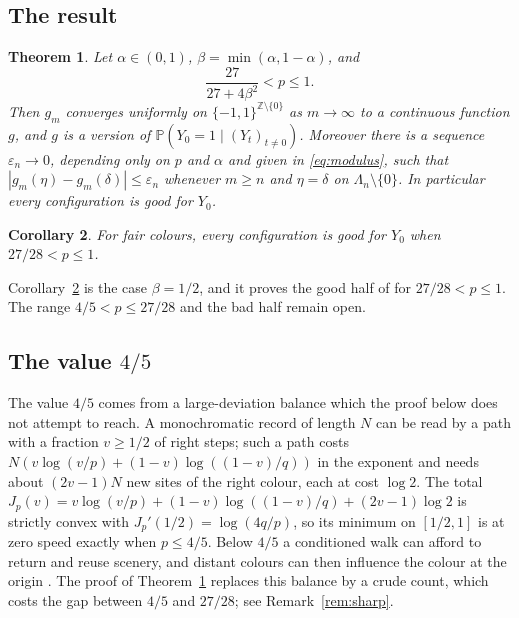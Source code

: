 \documentclass[11pt]{amsart}
\newtheorem{theorem}{Theorem}[section]
\newtheorem{corollary}[theorem]{Corollary}
\theoremstyle{remark}
\newcommand{\Z}{\mathbb{Z}}
\newcommand{\PP}{\mathbb{P}}
\begin{document}
\subsection{The result}

\begin{theorem}\label{thm:main}
Let $\alpha\in(0,1)$, $\beta=\min(\alpha,1-\alpha)$, and
\[
\frac{27}{27+4\beta^2}<p\le1 .
\]
Then $g_m$ converges uniformly on $\{-1,1\}^{\Z\setminus\{0\}}$ as $m\to\infty$ to a continuous function $g$, and $g$
is a version of $\PP(Y_0=1\mid(Y_t)_{t\ne0})$. Moreover there is a sequence $\varepsilon_n\to0$, depending only on
$p$ and $\alpha$ and given in \eqref{eq:modulus}, such that $|g_m(\eta)-g_m(\delta)|\le\varepsilon_n$ whenever $m\ge n$
and $\eta=\delta$ on $\Lambda_n\setminus\{0\}$. In particular every configuration is good for $Y_0$.
\end{theorem}

\begin{corollary}\label{cor:fair}
For fair colours, every configuration is good for $Y_0$ when $27/28<p\le1$.
\end{corollary}

Corollary~\ref{cor:fair} is the case $\beta=1/2$, and it proves the good half of \cite[Conjecture~2.16]{dHS06} for
$27/28<p\le1$. The range $4/5<p\le27/28$ and the bad half remain open.

\subsection{The value \texorpdfstring{$4/5$}{4/5}}
The value $4/5$ comes from a large-deviation balance which the proof below does not attempt to reach. A monochromatic
record of length $N$ can be read by a path with a fraction $v\ge1/2$ of right steps; such a path costs
$N(v\log(v/p)+(1-v)\log((1-v)/q))$ in the exponent and needs about $(2v-1)N$ new sites of the right colour, each at
cost $\log2$. The total $J_p(v)=v\log(v/p)+(1-v)\log((1-v)/q)+(2v-1)\log2$ is strictly convex with
$J_p'(1/2)=\log(4q/p)$, so its minimum on $[1/2,1]$ is at zero speed exactly when $p\le4/5$. Below $4/5$ a conditioned
walk can afford to return and reuse scenery, and distant colours can then influence the colour at the origin
\cite[Section~1.3]{BdHS11}. The proof of Theorem~\ref{thm:main} replaces this balance by a crude count, which costs the
gap between $4/5$ and $27/28$; see Remark~\ref{rem:sharp}.
\end{document}
